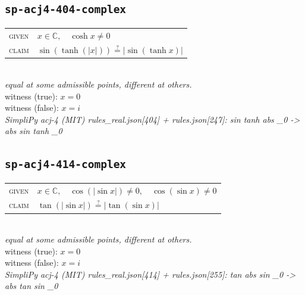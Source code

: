 \documentclass[11pt]{article}
\begin{document}
\subsection*{\texttt{sp-acj4-404-complex}}
\begin{tabular}{@{}l@{\quad}l@{}}
\textsc{given} & $x \in \mathbb{C},\quad \cosh x \neq 0$ \\[4pt]
\textsc{claim} & $\displaystyle \sin\left(\tanh\left(\left|x\right|\right)\right) \overset{?}{=} \left|\sin\left(\tanh x\right)\right|$ \\
\end{tabular}\\[2pt]
{\small\emph{equal at some admissible points, different at others.}}\\
{\footnotesize\color{gray}witness (true): $x = 0$}\\
{\footnotesize\color{gray}witness (false): $x = i$}\\
\emph{SimpliPy acj-4 (MIT) rules\_real.json[404] + rules.json[247]: sin tanh abs \_0  ->  abs sin tanh \_0}\\

\subsection*{\texttt{sp-acj4-414-complex}}
\begin{tabular}{@{}l@{\quad}l@{}}
\textsc{given} & $x \in \mathbb{C},\quad \cos\left(\left|\sin x\right|\right) \neq 0,\quad \cos\left(\sin x\right) \neq 0$ \\[4pt]
\textsc{claim} & $\displaystyle \tan\left(\left|\sin x\right|\right) \overset{?}{=} \left|\tan\left(\sin x\right)\right|$ \\
\end{tabular}\\[2pt]
{\small\emph{equal at some admissible points, different at others.}}\\
{\footnotesize\color{gray}witness (true): $x = 0$}\\
{\footnotesize\color{gray}witness (false): $x = i$}\\
\emph{SimpliPy acj-4 (MIT) rules\_real.json[414] + rules.json[255]: tan abs sin \_0  ->  abs tan sin \_0}\\
\end{document}
